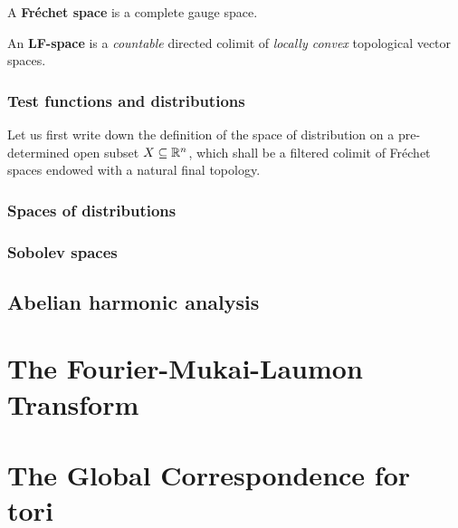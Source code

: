                 \begin{definition} \label{def: frechet_spaces}
                    A \textbf{Fr\'echet space} is a complete gauge space.
                \end{definition}
                
                \begin{definition}[LF-spaces] \label{def: LF_spaces}
                    An \textbf{LF-space} is a \textit{countable} directed colimit of \textit{locally convex} topological vector spaces.
                \end{definition}
                
            \subsubsection{Test functions and distributions}
                Let us first write down the definition of the space of distribution on a pre-determined open subset $X \subseteq \mathbb{R}^n$, which shall be a filtered colimit of Fr\'echet spaces endowed with a natural final topology.
                \begin{definition}[Distributions] \label{def: distributions}
                    
                \end{definition}
            
            \subsubsection{Spaces of distributions}
        
            \subsubsection{Sobolev spaces}
            
        \subsection{Abelian harmonic analysis}
    
    \section{The Fourier-Mukai-Laumon Transform}
    
    \section{The Global Correspondence for tori}